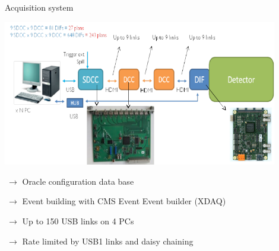 \documentclass[10pt]{beamer}
\begin{document}
\begin{frame}{Acquisition system}
 \centerline{\includegraphics[width=0.9\textwidth,height=0.45\textheight]{images/DAQLinks.png}}
 \begin{block}
   {\small 
          \par $ ~\rightarrow$  Oracle configuration data base
          \par $ ~\rightarrow$  Event building with CMS Event Event builder (XDAQ)
          \par $ ~ \rightarrow$ Up to 150 USB links on 4 PCs
          \par $ ~\rightarrow$  Rate limited by USB1 links and daisy chaining 


        }
 \end{block}
\end{frame}
\end{document}
